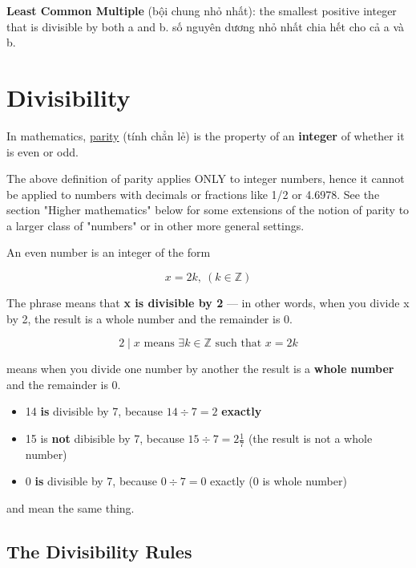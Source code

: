 \textbf{Least Common Multiple} (bội chung nhỏ nhất): the smallest positive integer that is divisible by both a and b. số nguyên dương nhỏ nhất chia hết cho cả a và b.

\section{Divisibility}

In mathematics, \href{https://en.wikipedia.org/wiki/Parity_%28mathematics%29}{parity} (tính chẳn lẻ) is the property of an \textbf{integer} of whether it is even or odd.

The above definition of parity applies ONLY to integer numbers, hence it cannot be applied to numbers with decimals or fractions like 1/2 or 4.6978. See the section "Higher mathematics" below for some extensions of the notion of parity to a larger class of "numbers" or in other more general settings. 

An even number is an integer of the form

\[x=2k,\ (k \in \mathbb{Z})\]

\vspace{10 mm}

The phrase  means that \textbf{x is divisible by 2} — in other words, when you divide x by 2, the result is a whole number and the remainder is 0.

\[2 \mid x \text{ means } \exists k \in \mathbb{Z} \text{ such that } x = 2k\]

 means when you divide one number by another the result is a \textbf{whole number} and the remainder is 0.

\begin{itemize}
  \item 14 \textbf{is} divisible by 7, because $14 \div 7 = 2$ \textbf{exactly}
  \item 15 is \textbf{not} dibisible by 7, because $15 \div 7 = 2\frac{1}{7}$ (the result is not a whole number)
  \item 0 \textbf{is} divisible by 7, because $0 \div 7 = 0$ exactly (0 is  whole number)
\end{itemize}

 and  mean the same thing.

\subsection{The Divisibility Rules}

